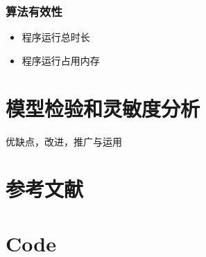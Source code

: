 \documentclass[12pt,a4paper]{article}
\begin{document}
\subsubsection{算法有效性}
\begin{itemize}
  \item 程序运行总时长
  \item 程序运行占用内存
\end{itemize}

\section{模型检验和灵敏度分析}
优缺点，改进，推广与运用
\section{参考文献}
\section{Code}
\end{document}
